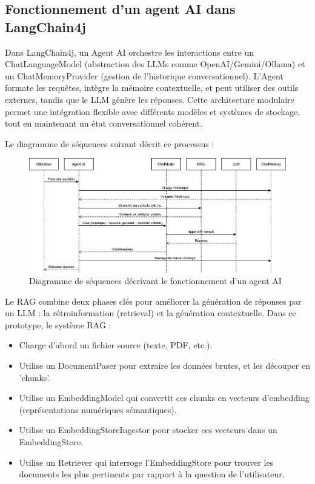 \documentclass[12pt,a4paper]{report}
\begin{document}
	\subsection{Fonctionnement d'un agent AI dans LangChain4j}
	
	Dans LangChain4j, un Agent AI orchestre les interactions entre un ChatLanguageModel (abstraction des LLMs comme OpenAI/Gemini/Ollama) et un ChatMemoryProvider (gestion de l'historique conversationnel). L'Agent formate les requêtes, intègre la mémoire contextuelle, et peut utiliser des outils externes, tandis que le LLM génère les réponses. Cette architecture modulaire permet une intégration flexible avec différents modèles et systèmes de stockage, tout en maintenant un état conversationnel cohérent.
	
	Le diagramme de séquences suivant décrit ce processus :
	
	\begin{figure}[H]
		\centering
		\includegraphics[width=\textwidth]{ds-ai-agent.drawio.png}
		\caption{Diagramme de séquences décrivant le fonctionnement d'un agent AI}
		\label{fig:ds-ai-agent.drawio}
	\end{figure}
	
	Le RAG combine deux phases clés pour améliorer la génération de réponses par un LLM : la rétroinformation (retrieval) et la génération contextuelle. Dans ce prototype, le système RAG :
	
	\begin{itemize}
		\item Charge d’abord un fichier source (texte, PDF, etc.).
		\item Utilise un DocumentPaser pour extraire les données brutes, et les découper en 'chunks'.
		\item Utilise un EmbeddingModel qui convertit ces chunks en vecteurs d’embedding (représentations numériques sémantiques).
		\item Utilise un EmbeddingStoreIngestor pour stocker ces vecteurs dans un EmbeddingStore.
		\item Utilise un Retriever qui interroge l’EmbeddingStore pour trouver les documents les plus pertinents par rapport à la question de l'utilisateur.
	\end{itemize}
	
\end{document}
